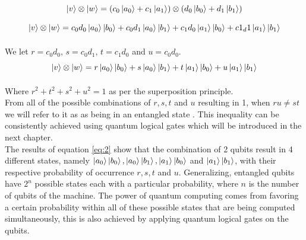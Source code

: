 \documentclass[12pt,a4paper]{scrartcl}
\newcommand{\tens}[1]{%
  \mathbin{\mathop{\otimes}\displaylimits_{#1}}%
}
\begin{document}
\[\ket{v} \tens{} \ket{w} = (c_0\ket{a_0} + c_1\ket{a_1}) \tens{} (d_0\ket{b_0} + d_1\ket{b_1}) \]
\[\ket{v} \tens{} \ket{w} = c_0d_0\ket{a_0}\ket{b_0} + c_0d_1\ket{a_0}\ket{b_1} + c_1d_0\ket{a_1}\ket{b_0} + c1_d1 \ket{a_1}\ket{b_1} \]

We let $r = c_0d_0$, $s = c_0d_1$, $t = c_1d_0$ and $u = c_0d_0$.
\begin{equation}\label{eq:2}
   \ket{v} \tens{} \ket{w} = r\ket{a_0}\ket{b_0} + s\ket{a_0}\ket{b_1} + t\ket{a_1}\ket{b_0} + u\ket{a_1}\ket{b_1} 
\end{equation}

Where $r^2 + t^2 + s^2 + u^2 = 1$ as per the superposition principle. \\

From all of the possible combinations of $r, s, t$ and $u$ resulting in 1, when $ru \ne st$ we will refer to it as as being in an entangled state \cite{bernhardt2019quantum}. This inequality can be consistently achieved using quantum logical gates which will be introduced in the next chapter. \\

The results of equation \ref{eq:2} show that the combination of 2 qubits result in 4 different states, namely $\ket{a_0}\ket{b_0}, \ket{a_0}\ket{b_1}, \ket{a_1}\ket{b_0}$ and $\ket{a_1}\ket{b_1}$, with their respective probability of occurrence $r, s, t$ and $u$. Generalizing, entangled qubits have $2^n$ possible states each with a particular probability, where $n$ is the number of qubits of the machine. The power of quantum computing comes from favoring a certain probability within all of these possible states that are being computed simultaneously, this is also achieved by applying quantum logical gates on the qubits\cite{youtube:smith2018}.\\
\end{document}
